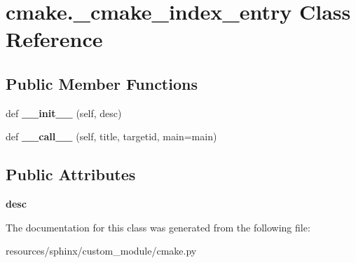\hypertarget{classcmake_1_1__cmake__index__entry}{}\section{cmake.\+\_\+cmake\+\_\+index\+\_\+entry Class Reference}
\label{classcmake_1_1__cmake__index__entry}
\subsection*{Public Member Functions}
\begin{DoxyCompactItemize}
\item 
\mbox{\label{classcmake_1_1__cmake__index__entry_a6bb8e17df4916fe1dc2f4912a46e3c7a}} 
def {\bfseries \+\_\+\+\_\+init\+\_\+\+\_\+} (self, desc)
\item 
\mbox{\label{classcmake_1_1__cmake__index__entry_a383f6275b69783c998f729d39ec6f20b}} 
def {\bfseries \+\_\+\+\_\+call\+\_\+\+\_\+} (self, title, targetid, main=\textquotesingle{}main\textquotesingle{})
\end{DoxyCompactItemize}
\subsection*{Public Attributes}
\begin{DoxyCompactItemize}
\item 
\mbox{\label{classcmake_1_1__cmake__index__entry_a07a63fe88514dffe16ae227623b64e57}} 
{\bfseries desc}
\end{DoxyCompactItemize}


The documentation for this class was generated from the following file\+:\begin{DoxyCompactItemize}
\item 
resources/sphinx/custom\+\_\+module/cmake.\+py\end{DoxyCompactItemize}

